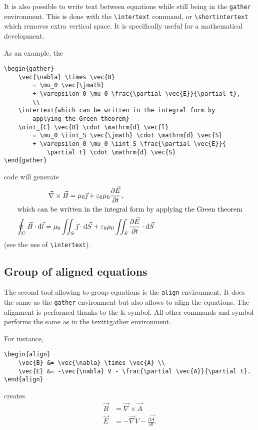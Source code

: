 		It is also possible to write text between equations while still being in the \texttt{gather} environment.
		This is done with the \texttt{\textbackslash{}intertext} command, or \texttt{\textbackslash{}shortintertext} which removes extra vertical space.
		It is specifically useful for a mathematical development.
		
		As an example, the	
\begin{lstlisting}[language={[LaTeX]TeX}]
\begin{gather}
	\vec{\nabla} \times \vec{B}
		= \mu_0 \vec{\jmath}
		+ \varepsilon_0 \mu_0 \frac{\partial \vec{E}}{\partial t},
		\\
	\intertext{which can be written in the integral form by 
		applying the Green theorem}
	\oint_{C} \vec{B} \cdot \mathrm{d} \vec{l}
		= \mu_0 \iint_S \vec{\jmath} \cdot \mathrm{d} \vec{S}
		+ \varepsilon_0 \mu_0 \iint_S \frac{\partial \vec{E}}{
			\partial t}	\cdot \mathrm{d} \vec{S}
\end{gather}
\end{lstlisting}	
		code will generate
		\begin{gather}
			\vec{\nabla} \times \vec{B}
				= \mu_0 \vec{\jmath}
				+ \varepsilon_0 \mu_0 \frac{\partial \vec{E}}{\partial t},
				\\
			\intertext{which can be written in the integral form by applying the Green theorem}
			\oint_{C} \vec{B} \cdot \mathrm{d} \vec{l}
				= \mu_0 \iint_S \vec{\jmath} \cdot \mathrm{d} \vec{S}
				+ \varepsilon_0 \mu_0 \iint_S \frac{\partial \vec{E}}{\partial t} \cdot \mathrm{d} \vec{S}
		\end{gather}
		(see the use of \texttt{\textbackslash{}intertext}).
	
	
	\subsection{Group of aligned equations}
	
		The second tool allowing to group equations is the \texttt{align} environment.
		It does the same as the \texttt{gather} environment but also allows to align the equations.
		The alignment is performed thanks to the \& symbol.
		All other commands and symbol performs the same as in the texttt{gather} environment.
		
		For instance,
\begin{lstlisting}[language={[LaTeX]TeX}]
\begin{align}
	\vec{B} &= \vec{\nabla} \times \vec{A} \\
	\vec{E} &= -\vec{\nabla} V - \frac{\partial \vec{A}}{\partial t}.
\end{align}
\end{lstlisting}
		creates
		\begin{align}
			\vec{B} &= \vec{\nabla} \times \vec{A} \\
			\vec{E} &= -\vec{\nabla} V - \frac{\partial \vec{A}}{\partial t}.
		\end{align}
	
